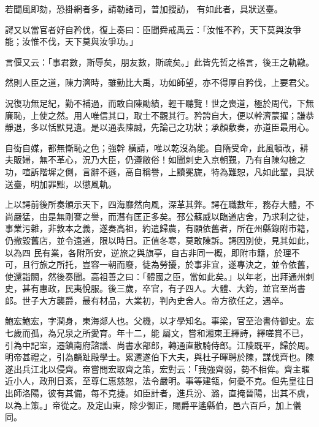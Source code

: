 \begin{pinyinscope}
 若聞風即劾，恐掛網者多，請勒諸司，普加搜訪，
 有如此者，具狀送臺。



 諤又以當官者好自矜伐，復上奏曰：臣聞舜戒禹云：「汝惟不矜，天下莫與汝爭能；汝惟不伐，天下莫與汝爭功。」



 言偃又云：「事君數，斯辱矣，朋友數，斯疏矣。」此皆先哲之格言，後王之軌轍。



 然則人臣之道，陳力濟時，雖勤比大禹，功如師望，亦不得厚自矜伐，上要君父。



 況復功無足紀，勤不補過，而敢自陳勛績，輕干聽覽！世之喪道，極於周代，下無廉恥，上使之然。用人唯信其口，取士不觀其行。矜誇自大，便以幹濟蒙擢；謙恭靜退，多以恬默見遺。是以通表陳誠，先論己之功狀；承顏敷奏，亦道臣最用心。



 自衒自媒，都無慚恥之色；強幹
 橫請，唯以乾沒為能。自隋受命，此風頓改，耕夫販婦，無不革心，況乃大臣，仍遵敝俗！如聞刺史入京朝覲，乃有自陳勾檢之功，喧訴階墀之側，言辭不遜，高自稱譽，上黷冕旒，特為難恕，凡如此輩，具狀送臺，明加罪黜，以懲風軌。



 上以諤前後所奏頒示天下，四海靡然向風，深革其弊。諤在職數年，務存大體，不尚嚴猛，由是無剛謇之譽，而潛有匡正多矣。邳公蘇威以臨道店舍，乃求利之徒，事業污雜，非敦本之義，遂奏高祖，約遣歸農，有願依舊者，所在州縣錄附市籍，仍撤毀舊店，並令遠道，限以時日。正值冬寒，莫敢陳訴。諤因別使，見其如此，以為四
 民有業，各附所安，逆旅之與旗亭，自古非同一概，即附市籍，於理不可，且行旅之所托，豈容一朝而廢，徒為勞擾，於事非宜，遂專決之，並令依舊，使還詣闕，然後奏聞。高祖善之曰：「體國之臣，當如此矣。」以年老，出拜通州刺史，甚有惠政，民夷悅服。後三歲，卒官，有子四人。大體、大鈞，並官至尚書郎。世子大方襲爵，最有材品，大業初，判內史舍人。帝方欲任之，遇卒。



 鮑宏鮑宏，字潤身，東海郯人也。父機，以才學知名。事梁，官至治書侍御史。宏七歲而孤，為兄泉之所愛育。年十二，能
 屬文，嘗和湘東王繹詩，繹嗟賞不已，引為中記室，遷鎮南府諮議、尚書水部郎，轉通直散騎侍郎。江陵既平，歸於周。明帝甚禮之，引為麟趾殿學士。累遷遂伯下大夫，與杜子暉聘於陳，謀伐齊也。陳遂出兵江北以侵齊。帝嘗問宏取齊之策，宏對云：「我強齊弱，勢不相侔。齊主暱近小人，政刑日紊，至尊仁惠慈恕，法令嚴明。事等建瓴，何憂不克。但先皇往日出師洛陽，彼有其備，每不克捷。如臣計者，進兵汾、潞，直掩晉陽，出其不虞，以為上策。」帝從之。及定山東，除少御正，賜爵平遙縣伯，邑六百戶，加上儀同。




\end{pinyinscope}
